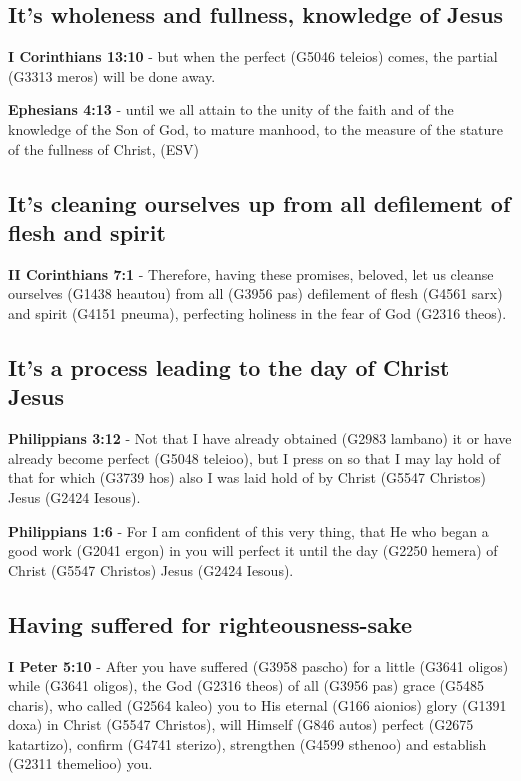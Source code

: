 \documentclass[11pt]{article}
\begin{document}
\subsection{It's wholeness and fullness, knowledge of Jesus}
\label{sec:org348b979}
\textbf{I Corinthians 13:10} - but when the perfect (G5046 teleios) comes, the partial (G3313 meros) will be done away.

\textbf{Ephesians 4:13} - until we all attain to the unity of the faith and of the knowledge of the Son of God, to mature manhood, to the measure of the stature of the fullness of Christ, (ESV)

\subsection{It's cleaning ourselves up from all defilement of flesh and spirit}
\label{sec:orgfbce872}
\textbf{II Corinthians 7:1} - Therefore, having these promises, beloved, let us cleanse ourselves (G1438 heautou) from all (G3956 pas) defilement of flesh (G4561 sarx) and spirit (G4151 pneuma), perfecting holiness in the fear of God (G2316 theos).

\subsection{It's a process leading to the day of Christ Jesus}
\label{sec:orgf0f0c4d}
\textbf{Philippians 3:12} - Not that I have already obtained (G2983 lambano) it or have already become perfect (G5048 teleioo), but I press on so that I may lay hold of that for which (G3739 hos) also I was laid hold of by Christ (G5547 Christos) Jesus (G2424 Iesous).

\textbf{Philippians 1:6} - For I am confident of this very thing, that He who began a good work (G2041 ergon) in you will perfect it until the day (G2250 hemera) of Christ (G5547 Christos) Jesus (G2424 Iesous).

\subsection{Having suffered for righteousness-sake}
\label{sec:org80940ee}
\textbf{I Peter 5:10} - After you have suffered (G3958 pascho) for a little (G3641 oligos) while (G3641 oligos), the God (G2316 theos) of all (G3956 pas) grace (G5485 charis), who called (G2564 kaleo) you to His eternal (G166 aionios) glory (G1391 doxa) in Christ (G5547 Christos), will Himself (G846 autos) perfect (G2675 katartizo), confirm (G4741 sterizo), strengthen (G4599 sthenoo) and establish (G2311 themelioo) you.
\end{document}
